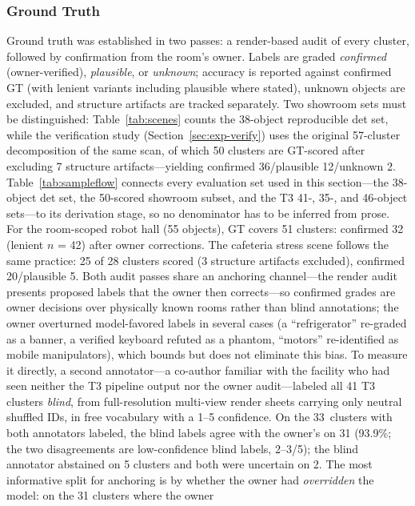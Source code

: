 \documentclass[electronics,article,accept,pdftex,moreauthors]{Definitions/mdpi}
\begin{document}
\subsubsection{Ground Truth}
Ground truth was established in two passes: a render-based audit of every
cluster, followed by confirmation from the room's owner. Labels are graded
\emph{confirmed} (owner-verified), \emph{plausible}, or \emph{unknown};
accuracy is reported against confirmed GT (with lenient variants including
plausible where stated), unknown objects are excluded, and structure
artifacts are tracked separately. Two showroom sets must be distinguished:
Table~\ref{tab:scenes} counts the 38-object reproducible det set, while the
verification study (Section~\ref{sec:exp-verify}) uses the original 57-cluster
decomposition of the same scan, of which 50 clusters are GT-scored after
excluding 7 structure artifacts---yielding confirmed 36/plausible 12/unknown 2. Table~\ref{tab:sampleflow} connects every evaluation set used
in this section---the 38-object det set, the 50-scored showroom subset,
and the T3 41-, 35-, and 46-object sets---to its derivation stage, so no
denominator has to be inferred from prose. For the room-scoped robot hall (55 objects), GT covers 51
clusters: confirmed 32 (lenient $n$ {=} 42) after owner corrections. The
cafeteria stress scene follows the same practice: 25 of 28 clusters scored
(3 structure artifacts excluded), confirmed 20/plausible 5. Both audit
passes share an anchoring channel---the render audit presents proposed
labels that the owner then corrects---so confirmed grades are owner
decisions over physically known rooms rather than blind annotations; the
owner overturned model-favored labels in several cases (a
``refrigerator'' re-graded as a banner, a verified keyboard refuted as a
phantom, ``motors'' re-identified as mobile manipulators), which bounds
but does not eliminate this bias. To measure it directly, a second
annotator---a co-author familiar with the facility who had seen neither
the T3 pipeline output nor the owner audit---labeled all 41 T3 clusters
\emph{blind}, from full-resolution multi-view render sheets carrying only
neutral shuffled IDs, in free vocabulary with a 1--5 confidence. On the
33~clusters with both annotators labeled, the blind labels agree with the
owner's on 31 (93.9\%; the two disagreements are low-confidence blind
labels, 2--3/5); the blind annotator abstained on 5 clusters and both
were uncertain on 2. The most informative split for anchoring is by whether the owner had
\emph{overridden} the model: on the 31 clusters where the owner
\end{document}
